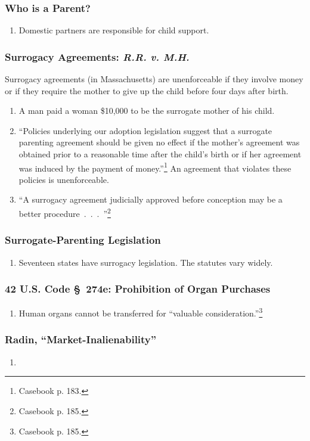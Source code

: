 \subsubsection{Who is a Parent?}

\begin{enumerate}
    \item Domestic partners are responsible for child support.
\end{enumerate}

\subsubsection{Surrogacy Agreements: \emph{R.R. v. M.H.}}

Surrogacy agreements (in Massachusetts) are unenforceable if they involve 
money or if they require the mother to give up the child before four days 
after birth.

\begin{enumerate}
    \item A man paid a woman \$10,000 to be the surrogate mother of his child.
    \item ``Policies underlying our adoption legislation suggest that a 
    surrogate parenting agreement should be given no effect if the mother's 
    agreement was obtained prior to a reasonable time after the child's birth 
    or if her agreement was induced by the payment of 
    money.''\footnote{Casebook p. 183.} An agreement that violates these 
    policies is unenforceable.
    \item ``A surrogacy agreement judicially approved before conception may be 
    a better procedure~.~.~.~''\footnote{Casebook p. 185.}
\end{enumerate}

\subsubsection{Surrogate-Parenting Legislation}

\begin{enumerate}
    \item Seventeen states have surrogacy legislation. The statutes vary 
    widely.
\end{enumerate}

\subsubsection{42 U.S. Code \S\ 274e: Prohibition of Organ Purchases}

\begin{enumerate}
    \item Human organs cannot be transferred for ``valuable 
    consideration.''\footnote{Casebook p. 185.}
\end{enumerate}

\subsubsection{Radin, ``Market-Inalienability''}

\begin{enumerate}
    \item %
\end{enumerate}

